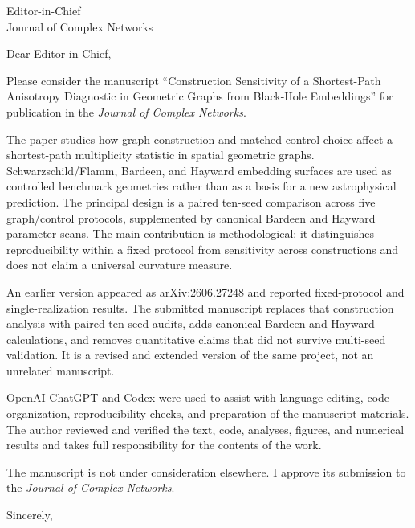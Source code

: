 \documentclass[11pt]{letter}
\begin{document}
\begin{letter}{Editor-in-Chief\\Journal of Complex Networks}
\opening{Dear Editor-in-Chief,}

Please consider the manuscript ``Construction Sensitivity of a Shortest-Path
Anisotropy Diagnostic in Geometric Graphs from Black-Hole Embeddings'' for
publication in the \emph{Journal of Complex Networks}.

The paper studies how graph construction and matched-control choice affect a
shortest-path multiplicity statistic in spatial geometric graphs.
Schwarzschild/Flamm, Bardeen, and Hayward embedding surfaces are used as
controlled benchmark geometries rather than as a basis for a new astrophysical
prediction. The principal design is a paired ten-seed comparison across five
graph/control protocols, supplemented by canonical Bardeen and Hayward
parameter scans. The main contribution is methodological: it distinguishes
reproducibility within a fixed protocol from sensitivity across constructions
and does not claim a universal curvature measure.

An earlier version appeared as arXiv:2606.27248 and reported fixed-protocol and
single-realization results. The submitted manuscript replaces that construction
analysis with paired ten-seed audits, adds canonical Bardeen and Hayward
calculations, and removes quantitative claims that did not survive multi-seed
validation. It is a revised and extended version of the same project, not an
unrelated manuscript.

OpenAI ChatGPT and Codex were used to assist with language editing, code
organization, reproducibility checks, and preparation of the manuscript
materials. The author reviewed and verified the text, code, analyses, figures,
and numerical results and takes full responsibility for the contents of the
work.

The manuscript is not under consideration elsewhere. I approve its submission
to the \emph{Journal of Complex Networks}.

\closing{Sincerely,}
\end{letter}
\end{document}
